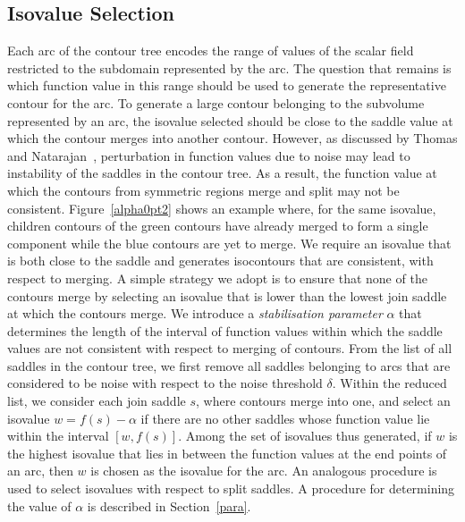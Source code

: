 \documentclass[review,journal]{vgtc}         %
\begin{document}
\subsection{Isovalue Selection}
Each arc of the contour tree encodes the range
of values of the scalar field restricted to the subdomain represented by the arc.
The question that remains is which function value in this range should be used
to generate the representative contour for the arc. To generate a large contour belonging 
to the subvolume represented by an arc, the isovalue selected should be close to
the saddle value at which the contour merges into another contour.  However, as discussed by 
Thomas and Natarajan~\cite{ThomN11}, perturbation in function values due to noise
may lead to instability of the saddles in the contour tree. As a result, the function value
at which the contours from symmetric regions merge and split may not be consistent. Figure~\ref{alpha0pt2}
shows an example where, for the same isovalue, children contours of the green contours 
have already merged to form a single component while the blue contours are yet to merge. 
We require an isovalue that is
both close to the saddle and generates isocontours that are consistent, with respect to merging. 
A simple strategy we adopt is to ensure that none of the contours merge by
selecting an isovalue that is lower than the lowest join saddle at which the contours merge.
We introduce a \emph{stabilisation parameter} $\alpha$ that determines
the length of the interval of function values within which the saddle values are not consistent 
with respect to merging of contours. From the list of all saddles in the contour tree, we first remove 
all saddles belonging to arcs that are considered to 
be noise with respect to the noise threshold $\delta$. Within the reduced list, we consider each join saddle $s$,
where contours merge into one, and select an isovalue $w = f(s)-\alpha$ if there are no other 
saddles whose function value lie within the interval $[w,f(s)]$. Among the set of isovalues thus generated,
if $w$ is the highest isovalue that lies in between the function values at the 
end points of an arc, then $w$ is chosen as the isovalue for the arc. 
An analogous procedure is used to select isovalues with respect to split saddles. 
A procedure for determining the value of $\alpha$ is described in Section~\ref{para}.
%
\end{document}
